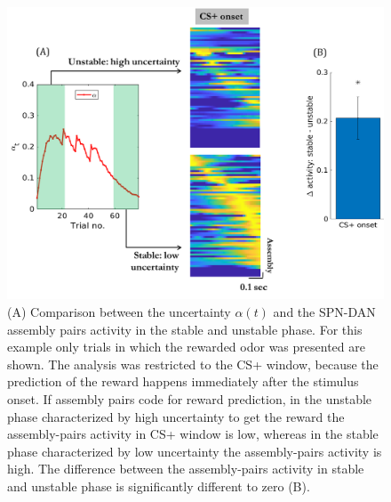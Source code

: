 \begin{figure}
    \centering
 \includegraphics[scale=0.49]{figures/PreRegress.png}
 \caption{(A) Comparison between the uncertainty $\alpha(t)$ and the SPN-DAN assembly pairs activity in the stable and unstable phase. For this example only trials in which the rewarded odor was presented are shown. The analysis was restricted to the CS+ window, because the prediction of the reward happens immediately after the stimulus onset. If assembly pairs code for reward prediction, in the unstable phase characterized by high uncertainty to get the reward the assembly-pairs activity in CS+ window is low, whereas in the stable phase characterized by low uncertainty the assembly-pairs activity is high. The difference between the assembly-pairs activity in stable and unstable phase is significantly different to zero (B).}
\label{fig:StableUnstableAlphaCS}
\end{figure}
